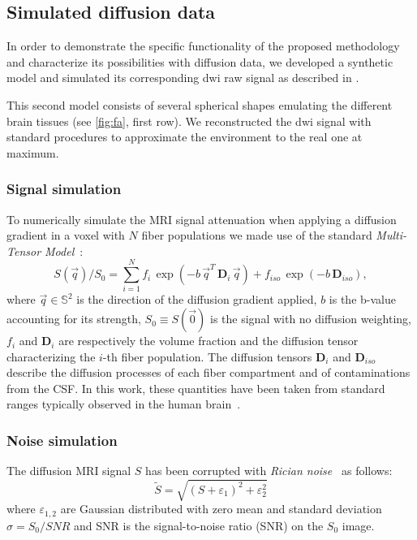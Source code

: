 %
\subsection{Simulated diffusion data}
%
In order to demonstrate the specific functionality of the proposed
methodology and characterize its possibilities with diffusion data, we developed a
synthetic model and simulated its corresponding \ac{dwi}
raw signal as described in \citep{tuch_q-ball_2004}. 

This second model consists of several spherical shapes emulating
the different brain tissues (see \autoref{fig:fa}, first row). 
We reconstructed the \ac{dwi} signal with standard procedures to 
approximate the environment to the real one at maximum. \\

\subsubsection{Signal simulation}

To numerically simulate the MRI signal attenuation when applying a diffusion gradient in a voxel with $N$ fiber populations we made use of the standard \emph{Multi-Tensor Model}~\cite{Tuch:2002aa}:
%
\begin{equation} \label{eqn:MultiTensor}
S(\vec{q}) / S_{0} = \sum_{i=1}^{N} f_{i} \, \exp{ \left( -b \, \vec{q}^{T} \, \mathbf{D}_i \, \vec{q}\right) } + f_{iso} \, \exp{ \left( -b \, \mathbf{D}_{iso} \right) } ,
\end{equation}
%
where $\vec{q} \in \mathbb{S}^2$ is the direction of the diffusion gradient applied, $b$ is the b-value accounting for its strength, $S_0 \equiv S(\vec{0})$ is the signal with no diffusion weighting, $f_i$ and $\mathbf{D}_i$ are respectively the volume fraction and the diffusion tensor characterizing the $i$-th fiber population.
The diffusion tensors $\mathbf{D}_i$ and $\mathbf{D}_{iso}$ describe the diffusion processes of each fiber compartment and of contaminations from the CSF. In this work, these quantities have been taken from standard ranges typically observed in the human brain~\cite{Canales-Rodriguez:2009aa}.




\subsubsection{Noise simulation}

The diffusion MRI signal $S$ has been corrupted with \textit{Rician noise}~\cite{Gudbjartsson:1995aa} as follows:
%
\begin{equation}
	\tilde{S} = \sqrt{ (S + \varepsilon_1)^2 + \varepsilon_2^2 }
\end{equation}
%
where $\varepsilon_{1,2}$ are Gaussian distributed with zero mean and standard deviation $\sigma = S_0 / \mathit{SNR}$ and SNR is the signal-to-noise ratio (SNR) on the $S_0$ image.


